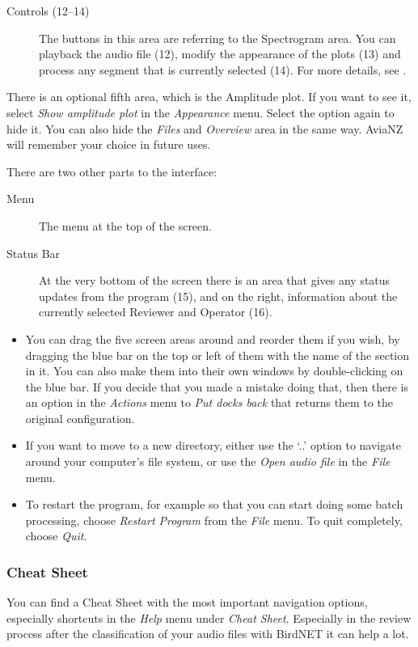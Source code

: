 \documentclass{scrartcl}
\begin{document}
\begin{description}


	\item[Controls (12--14)] The buttons in this area are referring to the Spectrogram area. 
		You can playback the audio file (12), modify the appearance of the plots (13) and process any segment that is currently selected (14).
		For more details, see .
	\end{description}

There is an optional fifth area, which is the Amplitude plot.
If you want to see it, select \textit{Show amplitude plot} in the \textit{Appearance} menu.
Select the option again to hide it.
You can also hide the \textit{Files} and \textit{Overview} area in the same way.
AviaNZ will remember your choice in future uses.

There are two other parts to the interface:
	\begin{description}
	\item[Menu] The menu at the top of the screen. 
	\item[Status Bar] At the very bottom of the screen there is an area that gives any status updates from the program (15), and on the right, information about the currently selected Reviewer and Operator (16).
	\end{description}

\begin{itemize}
	\item You can drag the five screen areas around and reorder them if you wish, by dragging the blue bar on the top or left of them with the name of the section in it.
		You can also make them into their own windows by double-clicking on the blue bar.
		If you decide that you made a mistake doing that, then there is an option in the \textit{Actions} menu to \textit{Put docks back} that returns them to the original configuration.

	\item If you want to move to a new directory, either use the `..' option to navigate around your computer's file system, or use the  \textit{Open audio file} in the \textit{File} menu.
	\item To restart the program, for example so that you can start doing some batch processing, choose \textit{Restart Program} from the \textit{File} menu. To quit completely, choose \textit{Quit}. 
\end{itemize}


\subsubsection{Cheat Sheet}
You can find a Cheat Sheet with the most important navigation options, especially shortcuts in the \textit{Help} menu under \textit{Cheat Sheet}.
Especially in the review process after the classification of your audio files with BirdNET it can help a lot.
\end{document}
